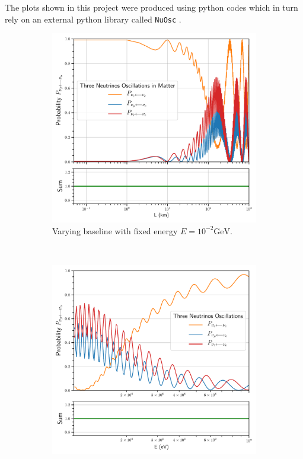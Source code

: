 \documentclass[twocolumn,secnumarabic,amssymb, nobibnotes, aps, prd,10pt]{revtex4-1}
\begin{document}
The plots shown in this project were produced using python codes \cite{} which in turn rely
on an external python library called \texttt{NuOsc} \cite{}.
\begin{figure}
\captionsetup[subfigure]{aboveskip=-1.5pt,belowskip=-1.5pt} 
\begin{subfigure}{1.05\linewidth}
\includegraphics[width=\linewidth]{Osc3MatterBaseline.pdf}
\caption{Varying baseline with fixed energy $E=10^{-2} \mathrm{GeV}$.} 
\label{higgs:sspt} 
\end{subfigure} 
\\
\begin{subfigure}{1.05\linewidth}
\includegraphics[width=\linewidth]{Osc3MatterEnergy.pdf}

\end{subfigure}
\end{figure}
\end{document}
